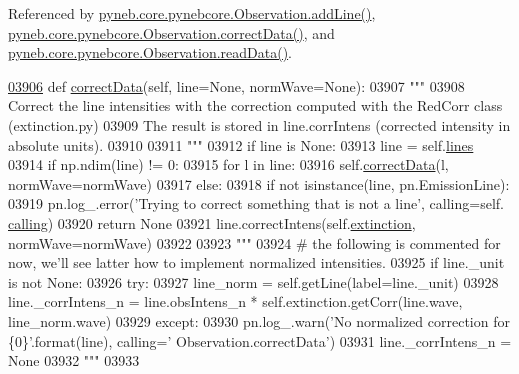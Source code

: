 Referenced by \hyperlink{pynebcore_8py_source_l03436}{pyneb.\+core.\+pynebcore.\+Observation.\+add\+Line()}, \hyperlink{pynebcore_8py_source_l03906}{pyneb.\+core.\+pynebcore.\+Observation.\+correct\+Data()}, and \hyperlink{pynebcore_8py_source_l03589}{pyneb.\+core.\+pynebcore.\+Observation.\+read\+Data()}.


\begin{DoxyCode}
\hypertarget{classpyneb_1_1core_1_1pynebcore_1_1_observation_l03906}{}\hyperlink{classpyneb_1_1core_1_1pynebcore_1_1_observation_a823a1fa51f042f2734cbc323c6a7d4bb}{03906}     \textcolor{keyword}{def }\hyperlink{classpyneb_1_1core_1_1pynebcore_1_1_observation_a823a1fa51f042f2734cbc323c6a7d4bb}{correctData}(self, line=None, normWave=None):
03907         \textcolor{stringliteral}{"""}
03908 \textcolor{stringliteral}{        Correct the line intensities with the correction computed with the RedCorr class (extinction.py)}
03909 \textcolor{stringliteral}{        The result is stored in line.corrIntens (corrected intensity in absolute units).}
03910 \textcolor{stringliteral}{}
03911 \textcolor{stringliteral}{        """}
03912         \textcolor{keywordflow}{if} line \textcolor{keywordflow}{is} \textcolor{keywordtype}{None}:
03913             line = self.\hyperlink{classpyneb_1_1core_1_1pynebcore_1_1_observation_a78332043ca9f290590edf6b8a1e5b767}{lines}
03914         \textcolor{keywordflow}{if} np.ndim(line) != 0:
03915             \textcolor{keywordflow}{for} l \textcolor{keywordflow}{in} line:
03916                 self.\hyperlink{classpyneb_1_1core_1_1pynebcore_1_1_observation_a823a1fa51f042f2734cbc323c6a7d4bb}{correctData}(l, normWave=normWave)
03917         \textcolor{keywordflow}{else}:
03918             \textcolor{keywordflow}{if} \textcolor{keywordflow}{not} isinstance(line, pn.EmissionLine):
03919                 pn.log\_.error(\textcolor{stringliteral}{'Trying to correct something that is not a line'}, calling=self.
      \hyperlink{classpyneb_1_1core_1_1pynebcore_1_1_observation_a2639fad9af4fefad20e4097295bd40e7}{calling})
03920                 \textcolor{keywordflow}{return} \textcolor{keywordtype}{None}  
03921             line.correctIntens(self.\hyperlink{classpyneb_1_1core_1_1pynebcore_1_1_observation_acdd6227c32bd92ec4a15b83110bcb570}{extinction}, normWave=normWave)
03922 
03923             \textcolor{stringliteral}{"""            }
03924 \textcolor{stringliteral}{            # the following is commented for now, we'll see latter how to implement normalized intensities.}
03925 \textcolor{stringliteral}{            if line.\_unit is not None:}
03926 \textcolor{stringliteral}{                try:}
03927 \textcolor{stringliteral}{                    line\_norm = self.getLine(label=line.\_unit)}
03928 \textcolor{stringliteral}{                    line.\_corrIntens\_n = line.obsIntens\_n * self.extinction.getCorr(line.wave,
       line\_norm.wave)}
03929 \textcolor{stringliteral}{                except:}
03930 \textcolor{stringliteral}{                    pn.log\_.warn('No normalized correction for \{0\}'.format(line), calling='
      Observation.correctData')}
03931 \textcolor{stringliteral}{                    line.\_corrIntens\_n = None}
03932 \textcolor{stringliteral}{            """}
03933             
\end{DoxyCode}
